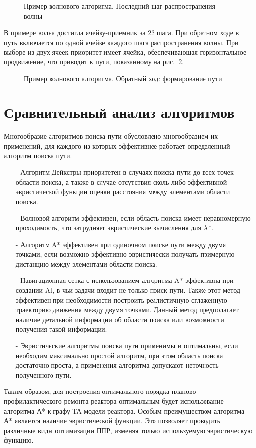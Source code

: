 \begin{figure}[h!t]
\caption{Пример волнового алгоритма. Последний шаг распространения волны}
\label{ris:wave-5}
\end{figure}

В примере волна достигла ячейку-приемник за 23 шага.
При обратном ходе в путь включается по одной ячейке каждого шага распространения волны. 
При выборе из двух ячеек приоритет имеет ячейка, обеспечивающая горизонтальное продвижение, что приводит к пути, показанному на рис.~\ref{ris:wave-6}.

\begin{figure}[h!t]
\caption{Пример волнового алгоритма. Обратный ход: формирование пути}
\label{ris:wave-6}
\end{figure}

\section{Сравнительный анализ алгоритмов}
Многообразие алгоритмов поиска пути обусловлено многообразием их применений, для каждого из которых эффективнее работает определенный алгоритм поиска пути.
\begin{itemize}
\item [-] Алгоритм Дейкстры приоритетен в случаях поиска пути до всех точек области поиска, а также в случае отсутствия сколь либо эффективной эвристической функции оценки расстояния между элементами области поиска.
\item [-] Волновой алгоритм эффективен, если область поиска имеет неравномерную проходимость, что затрудняет эвристические вычисления для A*.
\item [-] Алгоритм A* эффективен при одиночном поиске пути между двумя точками, если возможно эффективно эвристически получать примерную дистанцию между элементами области поиска.
\item [-] Навигационная сетка с использованием алгоритма A* эффективна при создании AI, в чьи задачи входит не только поиск пути. Также этот метод эффективен при необходимости построить реалистичную сглаженную траекторию движения между двумя точками. Данный метод предполагает наличие детальной информации об области поиска или возможности получения такой информации.
\item [-] Эвристические алгоритмы поиска пути применимы и оптимальны, если необходим максимально простой алгоритм, при этом область поиска достаточно проста, а применения алгоритма допускают неточность полученного пути.  
\end{itemize}

Таким образом, для построения оптимального порядка планово-профилактического ремонта реактора оптимальным будет использование алгоритма А* к графу ТА-модели реактора.
Особым преимуществом алгоритма А* является наличие эвристической функции.
Это позволяет проводить различные виды оптимизации ППР, изменяя только используемую эвристическую функцию.

\clearpage